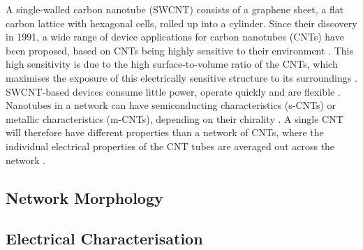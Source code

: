 \documentclass[
  a4paper,
]{scrbook}
\begin{document}
A single-walled carbon nanotube (SWCNT) consists of a graphene sheet, a
flat carbon lattice with hexagonal cells, rolled up into a cylinder.
Since their discovery in 1991, a wide range of device applications for
carbon nanotubes (CNTs) have been proposed, based on CNTs being highly
sensitive to their environment
\autocite{Iijima1991,Battie2010,Boyd2014,Chen2019}. This high
sensitivity is due to the high surface-to-volume ratio of the CNTs,
which maximises the exposure of this electrically sensitive structure to
its surroundings \autocite{Battie2010}. SWCNT-based devices consume
little power, operate quickly and are flexible \autocite{Chen2019}.
Nanotubes in a network can have semiconducting characteristics (s-CNTs)
or metallic characteristics (m-CNTs), depending on their chirality
\autocite{Martel1998,Kong2000}. A single CNT will therefore have
different properties than a network of CNTs, where the individual
electrical properties of the CNT tubes are averaged out across the
network \autocite{Battie2010}.

\hypertarget{network-morphology}{%
\subsection{Network Morphology}\label{network-morphology}}

\hypertarget{sec-electrical-characterisation-CNT}{%
\subsection{Electrical
Characterisation}\label{sec-electrical-characterisation-CNT}}
\end{document}

